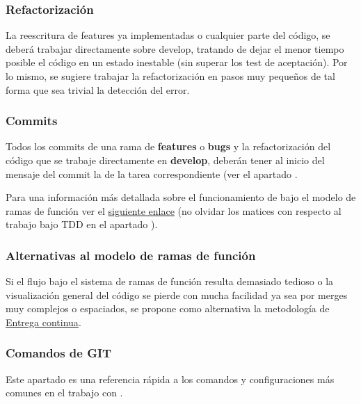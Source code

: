 \subsubsection{Refactorización}
La reescritura de features ya implementadas o cualquier parte del código, se deberá trabajar directamente sobre develop, tratando de dejar el menor tiempo posible el código en un estado inestable (sin superar los test de aceptación). Por lo mismo, se sugiere trabajar la refactorización en pasos muy pequeños de tal forma que sea trivial la detección del error.

\subsubsection{Commits}
Todos los commits de una rama de \textbf{features} o \textbf{bugs} y la refactorización del código que se trabaje directamente en \textbf{develop}, deberán tener al inicio del mensaje del commit la  de la tarea correspondiente (ver el apartado .

Para una información más detallada sobre el funcionamiento de  bajo el modelo de ramas de función ver el \href{https://www.atlassian.com/es/git/tutorials/comparing-workflows/feature-branch-workflow}{siguiente enlace} (no olvidar los matices con respecto al trabajo bajo TDD en el apartado ).


\subsubsection{Alternativas al modelo de ramas de función}\label{flujo:alternativas-al-branching}
Si el flujo bajo el sistema de ramas de función resulta demasiado tedioso o la visualización general del código se pierde con mucha facilidad ya sea por merges muy complejos o espaciados, se propone como alternativa la metodología de \href{https://es.wikipedia.org/wiki/Entrega_continua}{Entrega continua}.

\subsubsection{Comandos de GIT}\label{flujo:comandos-de-git}
Este apartado es una referencia rápida a los comandos y configuraciones más comunes en el trabajo con .

